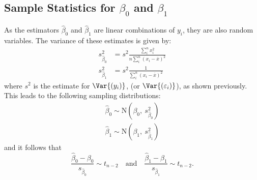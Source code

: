 \documentclass{article}
\begin{document}
\subsection{Sample Statistics for \texorpdfstring{$\beta_0$}{beta 0} and \texorpdfstring{$\beta_1$}{beta 1}}
As the estimators $\hat{\beta}_0$ and $\hat{\beta}_1$ are linear combinations of $y_i$, they are also random variables. The variance of these estimates is given by:
\begin{align*}
    s_{\hat{\beta}_0}^2 & = s^2 \frac{\sum_i^n x_i^2}{n\sum_i^n \left( x_i - \overline{x} \right)^2} \\
    s_{\hat{\beta}_1}^2 & = s^2 \frac{1}{\sum_i^n \left( x_i - \overline{x} \right)^2}
\end{align*}
where $s^2$ is the estimate for $\Var{\left( y_i \right)}$, (or $\Var{\left( \varepsilon_i \right)}$), as shown previously.
This leads to the following sampling distributions:
\begin{align*}
    \hat{\beta}_0 \sim \mathrm{N}{\left( \beta_0,\: s_{\hat{\beta}_0}^2 \right)} \\
    \hat{\beta}_1 \sim \mathrm{N}{\left( \beta_1,\: s_{\hat{\beta}_1}^2 \right)}
\end{align*}
and it follows that
\begin{equation*}
    \frac{\hat{\beta}_0 - \beta_0}{s_{\hat{\beta}_0}} \sim t_{n-2} \quad \text{and} \quad \frac{\hat{\beta}_1 - \beta_1}{s_{\hat{\beta}_1}} \sim t_{n-2}.
\end{equation*}
\end{document}
